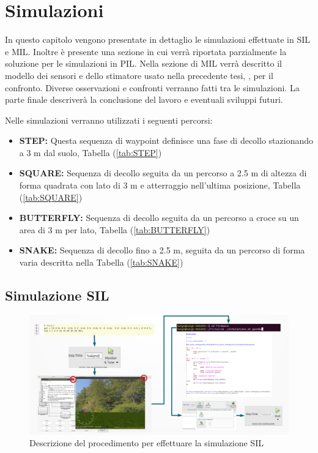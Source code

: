\chapter{Simulazioni}
\label{cap:simulazioni}
In questo capitolo vengono presentate in dettaglio le simulazioni effettuate in SIL e MIL. Inoltre è presente una sezione in cui verrà riportata parzialmente la soluzione per le simulazioni in PIL. Nella sezione di MIL verrà descritto il modello dei sensori e dello stimatore usato nella precedente tesi, \cite{DesTestCarm}, per il confronto. Diverse osservazioni e confronti verranno fatti tra le simulazioni. La parte finale descriverà la conclusione del lavoro e eventuali sviluppi futuri.

Nelle simulazioni verranno utilizzati i seguenti percorsi:
\begin{itemize}
		\item \textbf{STEP: } Questa sequenza di waypoint definisce una fase di decollo stazionando a 3 m dal suolo, Tabella (\ref{tab:STEP})
		\item \textbf{SQUARE: } Sequenza di decollo seguita da un percorso a 2.5 m di altezza di forma quadrata con lato di 3 m e atterraggio nell'ultima posizione, Tabella (\ref{tab:SQUARE})
		\item \textbf{BUTTERFLY: } Sequenza di decollo seguita da un percorso a croce su un area di 3 m per lato, Tabella (\ref{tab:BUTTERFLY})
		\item \textbf{SNAKE: } Sequenza di decollo fino a 2.5 m, seguita da un percorso di forma varia descritta nella Tabella (\ref{tab:SNAKE})
\end{itemize}

\section{Simulazione SIL}

\begin{figure}
	\centering
	\includegraphics[width=1\textwidth]{DescrizioneAutopilota/Figure/SIMSIL}
	\caption{Descrizione del procedimento per effettuare la simulazione SIL}
	\label{fig:SIMSIL}
\end{figure}


